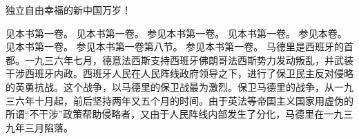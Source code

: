 独立自由幸福的新中国万岁！


\begin{maonote}
见本书第一卷。
见本书第一卷。
参见本书第一卷。
见本书第一卷。
参见本卷。
见本书第一卷。
参见本书第一卷第八节。
参见本书第一卷。
马德里是西班牙的首都。一九三六年七月，德意法西斯支持西班牙佛朗哥法西斯势力发动叛乱，并武装干涉西班牙内政。西班牙人民在人民阵线政府领导之下，进行了保卫民主反对侵略的英勇抗战。这个战争，以马德里的保卫战最为激烈。保卫马德里的战争，从一九三六年十月起，前后坚持两年又五个月的时间。由于英法等帝国主义国家用虚伪的所谓“不干涉”政策帮助侵略者，又由于人民阵线内部发生了分化，马德里在一九三九年三月陷落。
\end{maonote}
